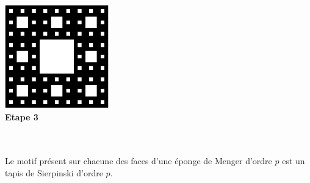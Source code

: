 \begin{minipage}{4.5cm}
\begin{center}
 \includegraphics[width=4.5cm]{images/carpet3.png}\\
\textbf{Etape 3}
\end{center}
\end{minipage}\\ 
\vspace*{0.5cm}\\
Le motif présent sur chacune des faces d'une éponge de Menger d'ordre $p$ est un tapis de Sierpinski d'ordre $p$.
